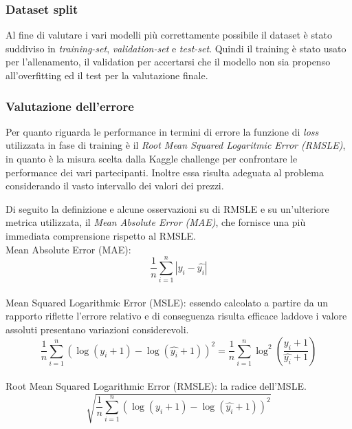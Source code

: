 \subsubsection{Dataset split}

Al fine di valutare i vari modelli più correttamente possibile il dataset è
stato suddiviso in \textit{training-set}, \textit{validation-set} e
\textit{test-set}. Quindi il training è stato usato per l'allenamento, il
validation per accertarsi che il modello non sia propenso all'overfitting ed il
test per la valutazione finale.

\subsubsection{Valutazione dell'errore}

Per quanto riguarda le performance in termini di errore la funzione di
\textit{loss} utilizzata in fase di training è il \textit{Root Mean Squared
Logaritmic Error (RMSLE)}, in quanto è la misura scelta dalla Kaggle challenge
per confrontare le performance dei vari partecipanti. Inoltre essa risulta
adeguata al problema considerando il vasto intervallo dei valori dei prezzi.

Di seguito la definizione e alcune osservazioni su di RMSLE e su un'ulteriore
metrica utilizzata, il \textit{Mean Absolute Error (MAE)},
che fornisce una più immediata comprensione rispetto al RMSLE. \\
Mean Absolute Error (MAE):
\begin{equation}
    \frac{1}{n} \sum_{i=1}^{n} | y_i - \hat{y_i} |
\end{equation}
\\
Mean Squared Logarithmic Error (MSLE): essendo calcolato a partire da un
rapporto riflette l'errore relativo e di conseguenza risulta efficace laddove i
valore assoluti presentano variazioni considerevoli.
\begin{equation}
    \frac{1}{n}
        \sum_{i=1}^{n}
            ( \log(y_i+1) - \log(\hat{y_i}+1) )^2
    =
    \frac{1}{n}
        \sum_{i=1}^{n}
            \log^2(\frac{y_i+1}{\hat{y_i}+1})
\end{equation}
\\
Root Mean Squared Logarithmic Error (RMSLE): la radice dell'MSLE.
\begin{equation}
    \sqrt{ 
        \frac{1}{n}
            \sum_{i=1}^{n}
                ( \log(y_i+1) - \log(\hat{y_i}+1) )^2
    }
\end{equation}

